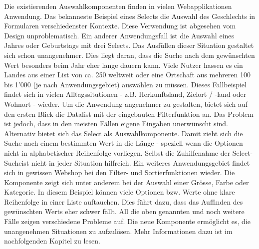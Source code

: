 Die existierenden Auswahlkomponenten finden in vielen Webapplikationen Anwendung.
Das bekanneste Beispiel eines Selects die Auswahl des Geschlechts in Formularen verschiedenster Kontexte.
Diese Verwendung ist abgesehen vom Design unproblematisch.
Ein anderer Anwendungsfall ist die Auswahl eines Jahres oder Geburtstags mit drei Selects.
Das Ausfüllen dieser Situation gestaltet sich schon unangenehmer.
Dies liegt daran, dass die Suche nach dem gewünschten Wert besonders beim Jahr eher lange dauern kann.
Viele Nutzer hassen es ein Landes aus einer List von ca. 250 weltweit oder eine Ortschaft aus mehreren 100 bis 1'000 (je nach Anwendungsgebiet) auswählen zu müssen.
Dieses Fallbeispiel findet sich in vielen Alltagssitutionen - z.B. Herkunftsland, Zielort / -land oder Wohnort - wieder.
Um die Anwendung angenehmer zu gestalten, bietet sich auf den ersten Blick die Datalist mit der eingebauten Filterfunktion an.
Das Problem ist jedoch, dass in den meisten Fällen eigene Eingaben unerwünscht sind.
Alternativ bietet sich das Select als Auswahlkomponente.
Damit zieht sich die Suche nach einem bestimmten Wert in die Länge - speziell wenn die Optionen nicht in alphabetischer Reihenfolge vorliegen.
Selbst die Zuhilfenahme der Select-Suche\footnotemark ist nicht in jeder Situation hilfreich. 
Ein weiteres Anwendungsgebiet findet sich in gewissen Webshop bei den Filter- und Sortierfunktionen wieder.
Die Komponente zeigt sich unter anderem bei der Auswahl einer Grösse, Farbe oder Kategorie.
In diesem Beispiel können viele Optionen bzw. Werte ohne klare Reihenfolge in einer Liste auftauchen.
Dies führt dazu, dass das Auffinden des gewünschten Werts eher schwer fällt.
All die oben genannten und noch weitere Fälle zeigen verschiedene Probleme auf.
Die neue Komponente ermöglicht es, die unangenehmen Situationen zu aufzulösen.
Mehr Informationen dazu ist im nachfolgenden Kapitel zu lesen.
